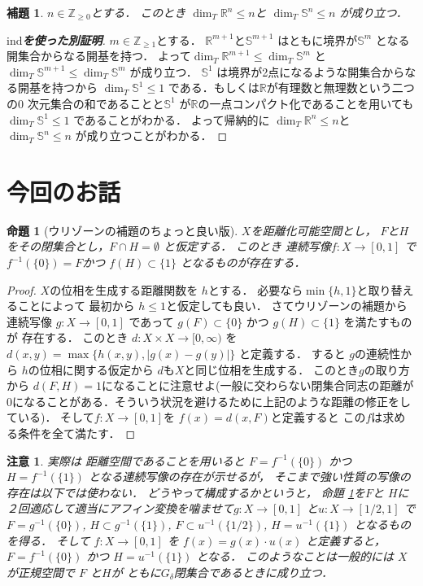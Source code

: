 \documentclass[leqno, a4paper, 12pt]{jsarticle}
\newtheorem{prop}[thm]{命題}
\newtheorem{lem}[thm]{補題}
\newtheorem*{rmk}{注意}
\newcommand{\zz}{\mathbb{Z}}
\newcommand{\rr}{\mathbb{R}}
\newcommand{\ind}{\mathrm{ind}}
\numberwithin{equation}{section}
\begin{document}
\begin{lem}\label{lem:nnn}
$n\in \zz_{\ge 0}$とする．
このとき
$\dim_{T}\rr^{n}\le n$と
$\dim_{T}\mathbb{S}^{n}\le n$
が成り立つ．
\end{lem}
\begin{proof}[\textbf{$\ind$を使った別証明}]
$m\in \zz_{\ge 1}$とする．
$\rr^{m+1}$と$\mathbb{S}^{m+1}$
はともに境界が$\mathbb{S}^{m}$
となる開集合からなる開基を持つ．
よって$\dim_{T}\rr^{m+1}\le \dim_{T}\mathbb{S}^{m}$
と
$\dim_{T}\mathbb{S}^{m+1}\le \dim_{T}\mathbb{S}^{m}$
が成り立つ．
$\mathbb{S}^{1}$
は境界が2点になるような開集合からなる開基を持つから
$\dim_{T}\mathbb{S}^{1}\le 1$
である．もしくは$\rr$が有理数と無理数という二つの$0$
次元集合の和であることと$\mathbb{S}^{1}$
が$\rr$の一点コンパクト化であることを用いても
$\dim_{T}\mathbb{S}^{1}\le 1$
であることがわかる．
よって帰納的に
$\dim_{T}\rr^{n}\le n$と
$\dim_{T}\mathbb{S}^{n}\le n$
が成り立つことがわかる．
\end{proof}


\section{今回のお話}

\begin{prop}[ウリゾーンの補題のちょっと良い版]\label{prop:zerosetfunc}
$X$を距離化可能空間とし，
$F$と$H$をその閉集合とし，$F\cap H=\emptyset$
と仮定する．
このとき
連続写像$f\colon X\to [0, 1]$
で
$f^{-1}(\{0\})=F$かつ
$f(H)\subset \{1\}$
となるものが存在する．
\end{prop}
\begin{proof}
$X$の位相を生成する距離関数を
$h$とする．
必要なら$\min\{h, 1\}$と取り替えることによって
最初から
$h\le 1$と仮定しても良い．
さてウリゾーンの補題から
連続写像
$g\colon X\to [0, 1]$
であって
$g(F)\subset \{0\}$
かつ
$g(H)\subset \{1\}$
を満たすものが
存在する．
このとき
$d\colon X\times X\to [0, \infty)$
を
$d(x, y)=\max\{h(x, y), |g(x)-g(y)|\}$
と定義する．
すると
$g$の連続性から
$h$の位相に関する仮定から
$d$も$X$と同じ位相を生成する．
このとき$g$の取り方から
$d(F, H)=1$になることに注意せよ(一般に交わらない閉集合同志の距離が$0$になることがある．そういう状況を避けるために上記のような距離の修正をしている)．
そして$f\colon X\to [0, 1]$を
$f(x)=d(x, F)$と定義すると
この$f$は求める条件を全て満たす．
\end{proof}
\begin{rmk}
実際は
距離空間であることを用いると
$F=f^{-1}(\{0\})$
かつ
$H=f^{-1}(\{1\})$
となる連続写像の存在が示せるが，
そこまで強い性質の写像の存在は以下では使わない．
どうやって構成するかというと，
命題
\ref{prop:zerosetfunc}を$F$と
$H$に２回適応して適当にアフィン変換を噛ませて$g\colon X\to [0, 1]$
と$u\colon X\to [1/2, 1]$
で$F=g^{-1}(\{0\})$, $H\subset g^{-1}(\{1\})$, 
$F\subset u^{-1}(\{1/2\})$, 
$H=u^{-1}(\{1\})$
となるものを得る．
そして
$f\colon X\to [0, 1]$
を
$f(x)=g(x)\cdot u(x)$
と定義すると，
$F=f^{-1}(\{0\})$
かつ
$H=u^{-1}(\{1\})$
となる．
このようなことは一般的には
$X$が正規空間で
$F$
と$H$が
ともに$G_{\delta}$閉集合であるときに成り立つ．
\end{rmk}
\end{document}
